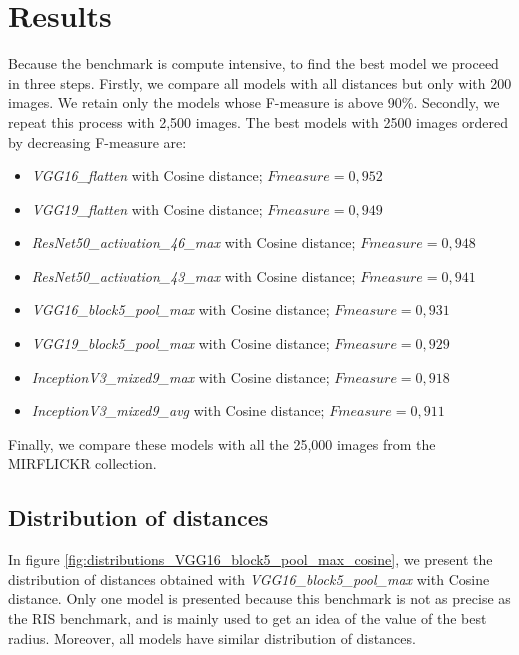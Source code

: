 \section{Results}
\label{chapter:CNNFeaturesRobustness:section:Results}

Because the benchmark is compute intensive, to find the best model we proceed in three steps. Firstly, we compare all models with all distances but only with 200 images. We retain only the models whose F-measure is above 90\%. Secondly, we repeat this process with 2,500 images. The best models with 2500 images ordered by decreasing F-measure are:

\begin{itemize} 
	\item \textit{VGG16\_flatten} with Cosine distance; $Fmeasure = 0,952$
	\item \textit{VGG19\_flatten} with Cosine distance; $Fmeasure = 0,949$
	\item \textit{ResNet50\_activation\_46\_max} with Cosine distance; $Fmeasure = 0,948$
	\item \textit{ResNet50\_activation\_43\_max} with Cosine distance; $Fmeasure = 0,941$
	\item \textit{VGG16\_block5\_pool\_max} with Cosine distance; $Fmeasure = 0,931$
	\item \textit{VGG19\_block5\_pool\_max} with Cosine distance; $Fmeasure = 0,929$
	\item \textit{InceptionV3\_mixed9\_max} with Cosine distance; $Fmeasure = 0,918$
	\item \textit{InceptionV3\_mixed9\_avg} with Cosine distance; $Fmeasure = 0,911$
\end{itemize}

Finally, we compare these models with all the 25,000 images from the MIRFLICKR collection.

\subsection{Distribution of distances}
In figure \ref{fig:distributions_VGG16_block5_pool_max_cosine}, we present the distribution of distances obtained with \textit{VGG16\_block5\_pool\_max} with Cosine distance. Only one model is presented because this benchmark is not as precise as the RIS benchmark, and is mainly used to get an idea of the value of the best radius. Moreover, all models have similar distribution of distances.

